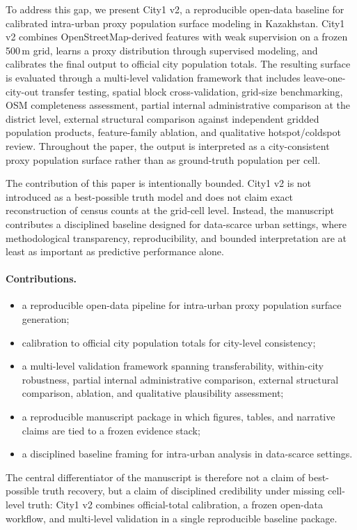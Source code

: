 To address this gap, we present City1 v2, a reproducible open-data baseline for calibrated intra-urban proxy population surface modeling in Kazakhstan. City1 v2 combines OpenStreetMap-derived features with weak supervision on a frozen 500\,m grid, learns a proxy distribution through supervised modeling, and calibrates the final output to official city population totals. The resulting surface is evaluated through a multi-level validation framework that includes leave-one-city-out transfer testing, spatial block cross-validation, grid-size benchmarking, OSM completeness assessment, partial internal administrative comparison at the district level, external structural comparison against independent gridded population products, feature-family ablation, and qualitative hotspot/coldspot review. Throughout the paper, the output is interpreted as a city-consistent proxy population surface rather than as ground-truth population per cell.

The contribution of this paper is intentionally bounded. City1 v2 is not introduced as a best-possible truth model and does not claim exact reconstruction of census counts at the grid-cell level. Instead, the manuscript contributes a disciplined baseline designed for data-scarce urban settings, where methodological transparency, reproducibility, and bounded interpretation are at least as important as predictive performance alone.

\paragraph{Contributions.}
\begin{itemize}
\item a reproducible open-data pipeline for intra-urban proxy population surface generation;
\item calibration to official city population totals for city-level consistency;
\item a multi-level validation framework spanning transferability, within-city robustness, partial internal administrative comparison, external structural comparison, ablation, and qualitative plausibility assessment;
\item a reproducible manuscript package in which figures, tables, and narrative claims are tied to a frozen evidence stack;
\item a disciplined baseline framing for intra-urban analysis in data-scarce settings.
\end{itemize}

The central differentiator of the manuscript is therefore not a claim of best-possible truth recovery, but a claim of disciplined credibility under missing cell-level truth: City1 v2 combines official-total calibration, a frozen open-data workflow, and multi-level validation in a single reproducible baseline package.
